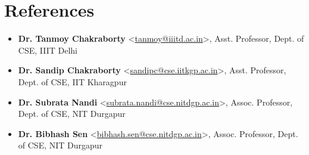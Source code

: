 \documentclass[letterpaper,11pt]{article}
\newcommand{\resumeSubHeadingListStart}{\begin{itemize}[leftmargin=*,label={}]}
\newcommand{\resumeSubHeadingListEnd}{\end{itemize}}
\begin{document}
\section{References}
\resumeSubHeadingListStart
\item[] \textbf{Dr. Tanmoy Chakraborty} \textless \href{mailto:tanmoy@iiitd.ac.in}{tanmoy@iiitd.ac.in}\textgreater, Asst. Professor, Dept. of CSE, IIIT Delhi
\item[] \textbf{Dr. Sandip Chakraborty} \textless \href{mailto:sandipc@cse.iitkgp.ac.in}{sandipc@cse.iitkgp.ac.in}\textgreater, Asst. Professor, Dept. of CSE, IIT Kharagpur
\item[] \textbf{Dr. Subrata Nandi} \textless \href{mailto:subrata.nandi@cse.nitdgp.ac.in}{subrata.nandi@cse.nitdgp.ac.in}\textgreater, Assoc. Professor, Dept. of CSE, NIT Durgapur
\item[] \textbf{Dr. Bibhash Sen} \textless \href{mailto:bibhash.sen@cse.nitdgp.ac.in}{bibhash.sen@cse.nitdgp.ac.in}\textgreater, Assoc. Professor, Dept. of CSE, NIT Durgapur
\resumeSubHeadingListEnd
\end{document}
